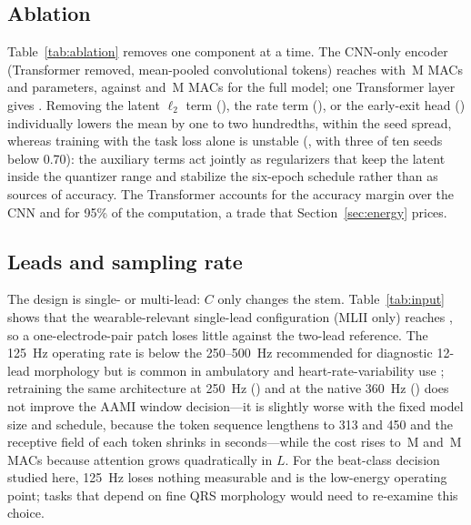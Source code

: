 \documentclass[journal]{IEEEtran}
\begin{document}
\subsection{Ablation}\label{sec:ablation}
\begin{table}[!t]
\centering
\caption{Ablation on the de Chazal protocol (10 seeds). MACs are per 10-s window at 125 Hz, two leads, including attention.}
\label{tab:ablation}
\small
\resizebox{\columnwidth}{!}{}
\end{table}
Table~\ref{tab:ablation} removes one component at a time. The CNN-only encoder (Transformer removed, mean-pooled convolutional tokens) reaches \cnnAUROC{} with \cnnMACs{}\,M MACs and \cnnParams{} parameters, against \mainAUROC{} and \mainMACs{}\,M MACs for the full model; one Transformer layer gives \tfoneAUROC{}. Removing the latent $\ell_2$ term (\noregAUROC{}), the rate term (\norateAUROC{}), or the early-exit head (\noeeAUROC{}) individually lowers the mean by one to two hundredths, within the seed spread, whereas training with the task loss alone is unstable (\taskonlyAUROC{}, with three of ten seeds below 0.70): the auxiliary terms act jointly as regularizers that keep the latent inside the quantizer range and stabilize the six-epoch schedule rather than as sources of accuracy. The Transformer accounts for the accuracy margin over the CNN and for 95\% of the computation, a trade that Section~\ref{sec:energy} prices.

\subsection{Leads and sampling rate}\label{sec:input}
\begin{table}[!t]
\centering
\caption{Input configuration (de Chazal protocol, 10 seeds each).}
\label{tab:input}
\small
\resizebox{\columnwidth}{!}{}
\end{table}
The design is single- or multi-lead: $C$ only changes the stem. Table~\ref{tab:input} shows that the wearable-relevant single-lead configuration (MLII only) reaches \mliiAUROC{}, so a one-electrode-pair patch loses little against the two-lead reference. The 125~Hz operating rate is below the 250--500~Hz recommended for diagnostic 12-lead morphology \cite{kligfield2007} but is common in ambulatory and heart-rate-variability use \cite{kwon2018}; retraining the same architecture at 250~Hz (\fsTwoFiftyAUROC{}) and at the native 360~Hz (\fsThreeSixtyAUROC{}) does not improve the AAMI window decision---it is slightly worse with the fixed model size and schedule, because the token sequence lengthens to 313 and 450 and the receptive field of each token shrinks in seconds---while the cost rises to \fsTwoFiftyMACs{}\,M and \fsThreeSixtyMACs{}\,M MACs because attention grows quadratically in $L$. For the beat-class decision studied here, 125~Hz loses nothing measurable and is the low-energy operating point; tasks that depend on fine QRS morphology would need to re-examine this choice.
\end{document}
